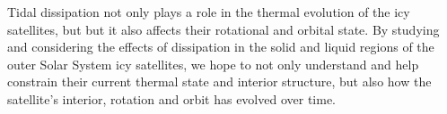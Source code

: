 Tidal dissipation not only plays a role in the thermal evolution of the icy satellites, but but it also affects their rotational and orbital state. By studying and considering the effects of dissipation in the solid and liquid regions of the outer Solar System icy satellites, we hope to not only understand and help constrain their current thermal state and interior structure, but also how the satellite's interior, rotation and orbit has evolved over time. 